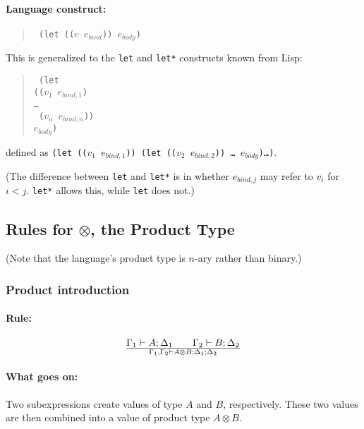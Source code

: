 \documentclass[a4paper]{article}
\begin{document}
\paragraph{Language construct:}
\begin{quote}\tt
(let (($v$ $e_{bind}$)) $e_{body}$)
\end{quote}
This is generalized to the \texttt{let} and \texttt{let*} constructs
known from Lisp:
\begin{quote}\tt
(let\\
  \phantom{ }\quad (($v_1$ $e_{bind,1}$)\\
  \phantom{ }\quad \ldots\\
  \phantom{ }\quad\ ($v_n$ $e_{bind,n}$))\\
  \phantom{ }\quad $e_{body}$)
\end{quote}
defined as \texttt{(let (($v_1$ $e_{bind,1}$)) (let (($v_2$ $e_{bind,2}$)) \ldots\ $e_{body}$)\ldots)}.

(The difference between \texttt{let} and \texttt{let*} is in whether
$e_{bind,j}$ may refer to $v_i$ for $i<j$. \texttt{let*} allows this,
while \texttt{let} does not.)



\subsection{Rules for $\otimes$, the Product Type}

(Note that the language's product type is $n$-ary rather than binary.)

\subsubsection{Product introduction}
\paragraph{Rule:}
$$
{
 {\Gamma_1 \vdash A;\Delta_1}
 \qquad
 {\Gamma_2 \vdash B;\Delta_2}
}\over{
 \Gamma_1, \Gamma_2 \vdash A \otimes B ; \Delta_1 ; \Delta_2
}
$$

\paragraph{What goes on:} Two subexpressions create values of type $A$
and $B$, respectively. These two values are then combined into a value
of product type $A \otimes B$.

\end{document}
